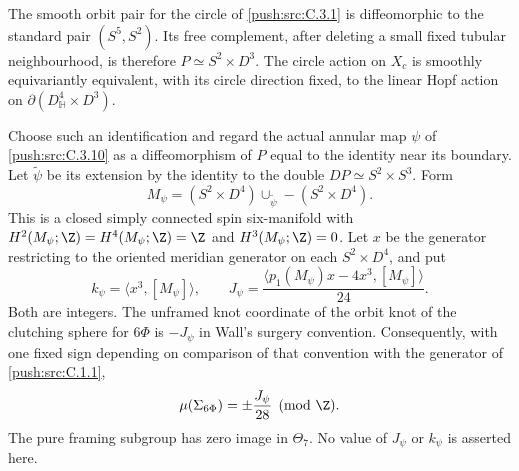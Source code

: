 \begin{proposition}\label{push:src:C.3.14}
The smooth orbit pair for the circle of \ref{push:src:C.3.1} is diffeomorphic to
the standard pair $(S^5,S^2)$. Its free complement, after deleting
a small fixed tubular neighbourhood, is therefore
$P\simeq S^2\times D^3$. The circle action on $X_c$ is smoothly
equivariantly equivalent, with its circle direction fixed, to the
linear Hopf action on
$\partial(D^4_{\mathbb H}\times D^3)$.

Choose such an identification and regard the actual annular map
$\psi$ of \ref{push:src:C.3.10} as a diffeomorphism of $P$ equal to the identity
near its boundary. Let $\widetilde\psi$ be its extension by the
identity to the double $DP\simeq S^2\times S^3$. Form
\[
 M_\psi=(S^2\times D^4)\cup_{\widetilde\psi}
                  -(S^2\times D^4).
\]
This is a closed simply connected spin six-manifold with
$H^2(M_\psi;\Z)=H^4(M_\psi;\Z)=\Z$ and $H^3(M_\psi;\Z)=0$.
Let $x$ be the generator restricting to the oriented meridian
generator on each $S^2\times D^4$, and put
\[
 k_\psi=\langle x^3,[M_\psi]\rangle,\qquad
 J_\psi=\frac{\langle p_1(M_\psi)x-4x^3,[M_\psi]\rangle}{24}.
\]
Both are integers. The unframed knot coordinate of the orbit
knot of the clutching sphere for $6\Phi$ is $-J_\psi$ in
Wall's surgery convention. Consequently, with one fixed sign
depending on comparison of that convention with the generator
of \ref{push:src:C.1.1},
\[
 \mu(\Sigma_{6\Phi})=\pm\frac{J_\psi}{28}\pmod\Z.
\]
The pure framing subgroup has zero image in $\Theta_7$.
No value of $J_\psi$ or $k_\psi$ is asserted here.
\end{proposition}

